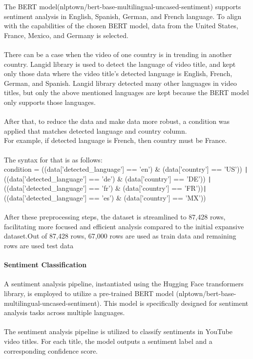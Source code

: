 \documentclass[12pt]{article}
\begin{document}
{{The BERT model(nlptown/bert-base-multilingual-uncased-sentiment) supports sentiment analysis in English, Spanish, German, and French language. To align with the capabilities of the chosen BERT model, data from the United States, France, Mexico, and Germany is selected.}\\ \\
{There can be a case when the video of one country is in trending in another country. Langid library is used to detect the language of video title, and kept only those data where the video title's detected language is English, French, German, and Spanish. Langid library detected many other languages in video titles, but only the above mentioned languages are kept because the BERT model only supports those languages.}\\ \\
{After that, to reduce the data and make data more robust, a condition was applied that matches detected language and country column.\\ 
For example, if detected language is French, then country must be France.}\\ \\ 
{The syntax for that is as follows:}\\
{condition = ((data['detected\_language'] == 'en') \& (data['country'] == 'US')) \texttt{|} ((data['detected\_language'] == 'de') \& (data['country'] == 'DE')) \texttt{|} ((data['detected\_language'] == 'fr') \& (data['country'] == 'FR'))\texttt{|} ((data['detected\_language'] == 'es') \& (data['country'] == 'MX'))}\\ \\
{After these preprocessing steps, the dataset is streamlined to 87,428 rows, facilitating more focused and efficient analysis compared to the initial expansive dataset.Out of 87,428 rows, 67,000 rows are used as train data and remaining rows are used test data}\\ \\
{\bf  Sentiment Classification}\\ \\
{A sentiment analysis pipeline, instantiated using the Hugging Face transformers library, is employed to utilize a pre-trained BERT model (nlptown/bert-base-multilingual-uncased-sentiment). This model is specifically designed for sentiment analysis tasks across multiple languages.}\\ \\ 
{The sentiment analysis pipeline is utilized to classify sentiments in YouTube video titles. For each title, the model outputs a sentiment label and a corresponding confidence score.}\\ \\
}
\end{document}
